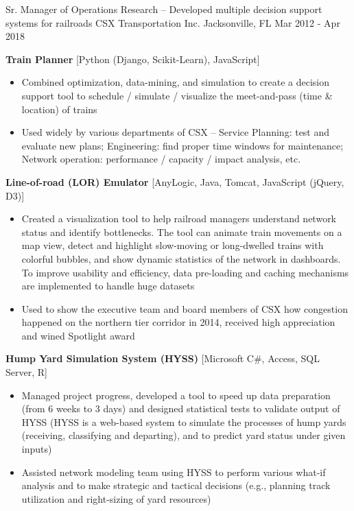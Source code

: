 \begin{cventries}

\cventry
{Sr. Manager of Operations Research \tiny{-- Developed multiple decision support systems for railroads}}            %
{CSX Transportation Inc. }                %
{Jacksonville, FL}                       %
{Mar 2012 - Apr 2018}                     %
{
    \begin{cvitems}
    \item {
        \textbf{Train Planner} 
        {\small{[Python (Django, Scikit-Learn), JavaScript]}}
        \begin{itemize}
            \item  Combined optimization, data-mining, and simulation to create a decision support tool to schedule / simulate / visualize the meet-and-pass (time \& location) of trains 
            \item Used widely by various departments of CSX -- Service Planning: test and evaluate new plans; Engineering: find proper time windows for maintenance; Network operation: performance / capacity / impact analysis, etc.
        \end{itemize}           
    }
    \item {
        \textbf{Line-of-road (LOR) Emulator} 
        {\small{[AnyLogic, Java, Tomcat, JavaScript (jQuery, D3)]}}
        \begin{itemize}
        \item  Created a visualization tool to help railroad managers understand network status and identify bottlenecks. The tool can animate train movements on a map view, detect and highlight slow-moving or long-dwelled trains with colorful bubbles, and show dynamic statistics of the network in dashboards. To improve usability and efficiency, data pre-loading and caching mechanisms are implemented to handle huge datasets
        \item  Used to show the executive team and board members of CSX how congestion happened on the northern tier corridor in 2014, received high appreciation and wined Spotlight award
        \end{itemize} 
	}
    \item {
        \textbf{Hump Yard Simulation System (HYSS)} {\small{[Microsoft C\#, Access, SQL Server, R]}}
        \begin{itemize}
        \item  Managed project progress, developed a tool to speed up data preparation (from 6 weeks to 3 days) and designed statistical tests to validate output of HYSS (HYSS is a web-based system to simulate the processes of hump yards (receiving, classifying and departing), and to predict yard status under given inputs)
        \item  Assisted network modeling team using HYSS to perform various what-if analysis and to make strategic and tactical decisions (e.g., planning track utilization and right-sizing of yard resources)
        \end{itemize}     
    }
    \end{cvitems}
}



\end{cventries}
